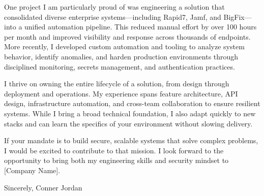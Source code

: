 \documentclass[letterpaper,11pt]{article}
\begin{document}
One project I am particularly proud of was engineering a solution that consolidated diverse enterprise systems—including Rapid7, Jamf, and BigFix—into a unified automation pipeline. This reduced manual effort by over 100 hours per month and improved visibility and response across thousands of endpoints. More recently, I developed custom automation and tooling to analyze system behavior, identify anomalies, and harden production environments through disciplined monitoring, secrets management, and authentication practices.

\vspace{16pt}

I thrive on owning the entire lifecycle of a solution, from design through deployment and operations. My experience spans feature architecture, API design, infrastructure automation, and cross-team collaboration to ensure resilient systems. While I bring a broad technical foundation, I also adapt quickly to new stacks and can learn the specifics of your environment without slowing delivery.

\vspace{16pt}

If your mandate is to build secure, scalable systems that solve complex problems, I would be excited to contribute to that mission. I look forward to the opportunity to bring both my engineering skills and security mindset to [Company Name].

\vspace{16pt}

Sincerely,  
Conner Jordan
\end{document}
